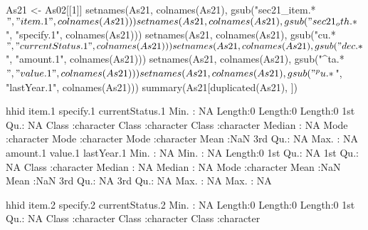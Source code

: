 \begin{Schunk}
\begin{Sinput}
As21 <- As02[[1]]
setnames(As21, colnames(As21), 
	gsub("sec21_item.*$", "item.1", colnames(As21)))
setnames(As21, colnames(As21), 
	gsub("sec21_oth.*$", "specify.1", colnames(As21)))
setnames(As21, colnames(As21), 
	gsub("cu.*$", "currentStatus.1", colnames(As21)))
setnames(As21, colnames(As21), 
	gsub("dec.*$", "amount.1", colnames(As21)))
setnames(As21, colnames(As21), 
	gsub("^ta.*$", "value.1", colnames(As21)))
setnames(As21, colnames(As21), 
	gsub("^pu.*$", "lastYear.1", colnames(As21)))
summary(As21[duplicated(As21), ])
\end{Sinput}
\begin{Soutput}
      hhid        item.1           specify.1         currentStatus.1   
 Min.   : NA   Length:0           Length:0           Length:0          
 1st Qu.: NA   Class :character   Class :character   Class :character  
 Median : NA   Mode  :character   Mode  :character   Mode  :character  
 Mean   :NaN                                                           
 3rd Qu.: NA                                                           
 Max.   : NA                                                           
    amount.1      value.1     lastYear.1       
 Min.   : NA   Min.   : NA   Length:0          
 1st Qu.: NA   1st Qu.: NA   Class :character  
 Median : NA   Median : NA   Mode  :character  
 Mean   :NaN   Mean   :NaN                     
 3rd Qu.: NA   3rd Qu.: NA                     
 Max.   : NA   Max.   : NA                     
\end{Soutput}
\begin{Soutput}
      hhid        item.2           specify.2         currentStatus.2   
 Min.   : NA   Length:0           Length:0           Length:0          
 1st Qu.: NA   Class :character   Class :character   Class :character  

\end{Soutput}
\end{Schunk}
